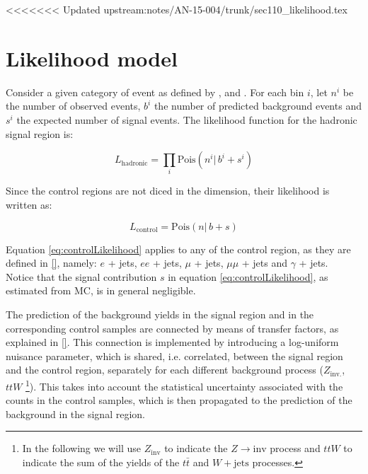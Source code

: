 <<<<<<< Updated upstream:notes/AN-15-004/trunk/sec110_likelihood.tex
\section{Likelihood model}
\label{sec:likelihood}

Consider a given category of event as defined by \njet, \nb and \HT.
For each \mht bin $i$, let $n^{i}$ be the number of observed events, $b^{i}$ the number of predicted 
background events and $s^{i}$ the expected number of signal events. 
The likelihood function for the hadronic signal region is:

\begin{equation}
L_{\mathrm{hadronic}}=\prod_i \mathrm{Pois}(n^i |\, b^i + s^i)
\label{eq:hadronicLikelihood}
\end{equation}

Since the control regions are not diced in the \mht dimension, their likelihood is written as:

\begin{equation}
L_{\mathrm{control}}=\mathrm{Pois}(n |\, b + s)
\label{eq:controlLikelihood}
\end{equation}

Equation \ref{eq:controlLikelihood} applies to any of the control region, 
as they are defined in \ref{}, namely: $e$ + jets, $ee$ + jets, $\mu$ + jets, $\mu\mu$ + jets and $\gamma$ + jets. \\ %
Notice that the signal contribution $s$ in equation \ref{eq:controlLikelihood}, as estimated from MC, is in general negligible.

The prediction of the background yields in the signal region and in the corresponding control samples are connected 
by means of transfer factors, as explained in \ref{}. %
This connection is implemented by introducing a log-uniform nuisance parameter, which is shared, i.e. correlated, 
between the signal region and the control region, separately for each different background process ($Z_{\mathrm{inv.}}$, $ttW$ \footnote{In the following we will use $Z_{\mathrm{inv}}$ to indicate the $Z\to \mathrm{inv}$ process and $ttW$ to indicate the sum of the yields of the $t\bar{t}$ and $W+\mathrm{jets}$ processes.}).
This takes into account the statistical uncertainty associated with the counts in the control samples, which is then propagated to the 
prediction of the background in the signal region.

